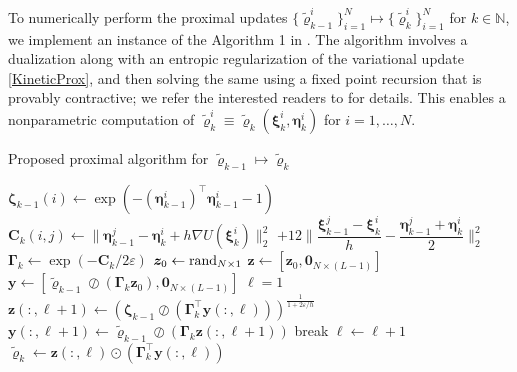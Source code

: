 \documentclass[10pt,twocolumn]{IEEEtran}
\begin{document}
To numerically perform the proximal updates $\{\tilde{\varrho}_{k-1}^{i}\}_{i=1}^{N}\mapsto\{\tilde{\varrho}_{k}^{i}\}_{i=1}^{N}$ for $k\in\mathbb{N}$, we implement an instance of the Algorithm 1 in \cite{caluya2019TAC}. The algorithm involves a dualization along
with an entropic regularization of the variational update \eqref{KineticProx}, and then solving the same using a fixed point recursion that is provably contractive; we refer the interested readers to \cite[Sec. V.B]{caluya2019TAC} for details. This enables a nonparametric computation of $\tilde{\varrho}_{k}^{i} \equiv \tilde{\varrho}_{k}\left(\bm{\xi}_{k}^{i},\bm{\eta}_{k}^{i}\right)$ for $i=1,\hdots,N$.
{\small{\begin{algorithm}[t]
\caption{Proposed proximal algorithm for $\tilde{\bm{\varrho}}_{k-1}\mapsto\tilde{\bm{\varrho}}_{k}$}
\label{algo:KineticProx}
\begin{algorithmic}[1]
\State $\bm{\zeta}_{k-1}(i) \gets \exp\left(-\left(\bm{\eta}_{k-1}^{i}\right)^{\top}\bm{\eta}_{k-1}^{i}-1\right)$
\State $\bm{C}_{k}(i,j) \gets \parallel\bm{\eta}_{k-1}^{j} - \bm{\eta}_{k}^{i}+ h\nabla U(\bm{\xi}_{k}^{i})\parallel_{2}^{2}$
\State \qquad\quad $+12\bigg\|\dfrac{\bm{\xi}_{k-1}^{j}-\bm{\xi}_{k}^{i}}{h} - \dfrac{\bm{\eta}_{k-1}^{j} + \bm{\eta}_{k}^{i}}{2}\bigg\|_{2}^{2}$
\EndFor
\EndFor
\State $\bm{\Gamma}_{k} \gets \exp\left(-\bm{C}_{k}/2\varepsilon\right)$ 
\State $\bm{z}_{0} \gets {\rm{rand}}_{N\times 1}$ 
\State $\bm{z} \gets \left[\bm{z}_{0}, \bm{0}_{N\times(L-1)}\right]$ 
\State $\bm{y} \gets \left[\tilde{\bm{\varrho}}_{k-1}\oslash\left(\bm{\Gamma}_{k}\bm{z}_{0}\right), \bm{0}_{N\times(L-1)}\right]$ 
\State $\ell = 1$
\State $\bm{z}(:,\ell+1) \gets \left(\bm{\zeta}_{k-1}\oslash\left(\bm{\Gamma}_{k}^{\top}\bm{y}(:,\ell)\right)\right)^{\frac{1}{1+2\varepsilon/h}}$
\State $\bm{y}(:,\ell+1) \gets \tilde{\bm{\varrho}}_{k-1} \oslash \left(\bm{\Gamma}_{k}\bm{z}(:,\ell+1)\right)$
 
\State break
\Else
\State $\ell \gets \ell + 1$
\EndIf
\EndWhile\\
\Return $\tilde{\bm{\varrho}}_{k} \gets \bm{z}(:,\ell) \odot \left(\bm{\Gamma}_{k}^{\top}\bm{y}(:,\ell)\right)$ 
\EndProcedure	
\end{algorithmic}
\end{algorithm}}}
\end{document}

